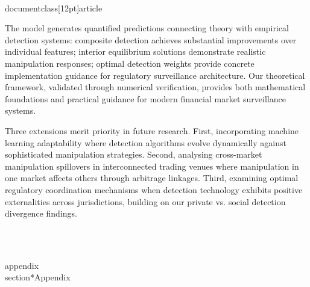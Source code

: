 \\documentclass[12pt]{article}
\begin{document}
The model generates quantified predictions connecting theory with empirical detection systems: composite detection achieves substantial improvements over individual features; interior equilibrium solutions demonstrate realistic manipulation responses; optimal detection weights provide concrete implementation guidance for regulatory surveillance architecture. Our theoretical framework, validated through numerical verification, provides both mathematical foundations and practical guidance for modern financial market surveillance systems.

Three extensions merit priority in future research. First, incorporating machine learning adaptability where detection algorithms evolve dynamically against sophisticated manipulation strategies. Second, analysing cross-market manipulation spillovers in interconnected trading venues where manipulation in one market affects others through arbitrage linkages. Third, examining optimal regulatory coordination mechanisms when detection technology exhibits positive externalities across jurisdictions, building on our private vs. social detection divergence findings.

\
\

\\appendix
\\section*{Appendix}
\end{document}
